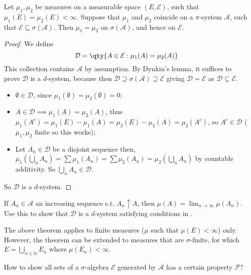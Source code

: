\begin{theorem} \label{thm:uni}
	Let $\mu_1, \mu_2$ be measures on a measurable space $(E, \mathcal E)$, such that $\mu_1(E) = \mu_2(E) < \infty$.
	Suppose that $\mu_1$ and $\mu_2$ coincide on a $\pi$-system $\mathcal A$, such that $\mathcal E \subseteq \sigma(\mathcal A)$.
	Then $\mu_1 = \mu_2$ on $\sigma(\mathcal A)$, and hence on $\mathcal E$.
\end{theorem}

\begin{proof}
	We define
	\[ \mathcal D = \qty{A \in \mathcal E : \mu_1(A) = \mu_2(A)} \]
	This collection contains $\mathcal A$ by assumption.
	By Dynkin's lemma, it suffices to prove $\mathcal D$ is a $d$-system, because then $\mathcal D \supseteq \sigma(\mathcal A) \supseteq \mathcal E$ giving $\mathcal D = \mathcal E$ as $\mathcal{D} \subseteq \mathcal{E}$.

	\begin{itemize}
		\item $\emptyset \in \mathcal{D}$, since $\mu_1(\emptyset) = \mu_2(\emptyset) = 0$;
		\item $A \in \mathcal{D} \implies \mu_1(A) = \mu_2(A)$, thus $\mu_1(A^c) = \mu_1(E) - \mu_1(A) = \mu_2(E) - \mu_2(A) = \mu_2(A^c)$, so $A^c \in \mathcal{D}$ ($\mu_1, \mu_2$ finite so this works);
		\item Let $A_n \in \mathcal{D}$ be a disjoint sequence then, $\mu_1(\bigcup_n A_n) = \sum \mu_1(A_n) = \sum \mu_2(A_n) = \mu_2(\bigcup_n A_n)$ by countable additivity. So $\bigcup_n A_n \in \mathcal{D}$.
	\end{itemize}
	So $\mathcal{D}$ is a $d$-system.
\end{proof}

\begin{remark}
	If $A_n \in \mathcal{A}$ an increasing sequence s.t. $A_n \uparrow A$, then $\mu(A) = \lim_{n \to \infty} \mu(A_n)$.
	Use this to show that $\mathcal{D}$ is a $d$-system satisfying conditions in .

	The above theorem applies to finite measures ($\mu$ such that $\mu(E) < \infty$) only.
	However, the theorem can be extended to measures that are $\sigma$-finite, for which $E = \bigcup_{n \in \mathbb N} E_n$ where $\mu(E_n) < \infty$.
\end{remark}

\begin{question}
	How to show all sets of a $\sigma$-algebra $\mathcal{E}$ generated by $\mathcal{A}$ has a certain property $\mathcal{P}$?
\end{question}

